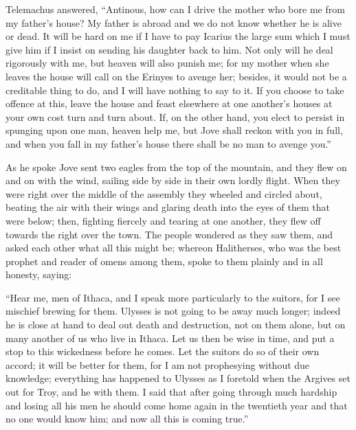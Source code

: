 Telemachus answered, “Antinous, how can I drive the mother who bore me from my
father’s house? My father is abroad and we do not know whether he is alive or
dead. It will be hard on me if I have to pay Icarius the large sum which I must
give him if I insist on sending his daughter back to him. Not only will he deal
rigorously with me, but heaven will also punish me; for my mother when she
leaves the house will call on the Erinyes to avenge her; besides, it would not
be a creditable thing to do, and I will have nothing to say to it. If you
choose to take offence at this, leave the house and feast elsewhere at one
another’s houses at your own cost turn and turn about. If, on the other hand,
you elect to persist in spunging upon one man, heaven help me, but Jove shall
reckon with you in full, and when you fall in my father’s house there shall be
no man to avenge you.”

As he spoke Jove sent two eagles from the top of the mountain, and they flew on
and on with the wind, sailing side by side in their own lordly flight. When
they were right over the middle of the assembly they wheeled and circled about,
beating the air with their wings and glaring death into the eyes of them that
were below; then, fighting fiercely and tearing at one another, they flew off
towards the right over the town. The people wondered as they saw them, and
asked each other what all this might be; whereon Halitherses, who was the best
prophet and reader of omens among them, spoke to them plainly and in all
honesty, saying:

“Hear me, men of Ithaca, and I speak more particularly to the suitors, for I
see mischief brewing for them. Ulysses is not going to be away much longer;
indeed he is close at hand to deal out death and destruction, not on them
alone, but on many another of us who live in Ithaca. Let us then be wise in
time, and put a stop to this wickedness before he comes. Let the suitors do so
of their own accord; it will be better for them, for I am not prophesying
without due knowledge; everything has happened to Ulysses as I foretold when
the Argives set out for Troy, and he with them. I said that after going through
much hardship and losing all his men he should come home again in the twentieth
year and that no one would know him; and now all this is coming true.”


